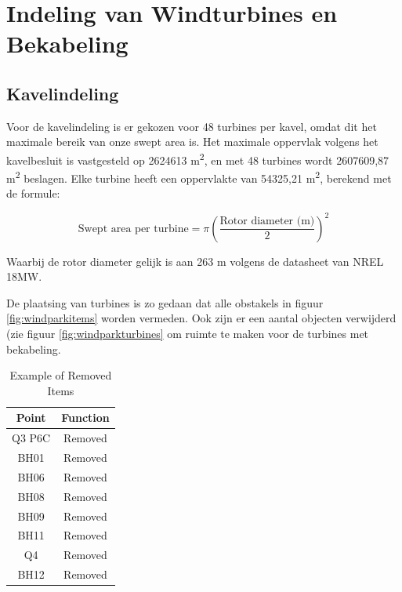 \section{Indeling van Windturbines en Bekabeling}
\subsection{Kavelindeling}
Voor de kavelindeling is er gekozen voor 48 turbines per kavel, omdat dit het maximale bereik van onze swept area is. Het maximale oppervlak volgens het kavelbesluit is vastgesteld op 2624613 m\textsuperscript{2}, en met 48 turbines wordt 2607609,87 m\textsuperscript{2} beslagen. Elke turbine heeft een oppervlakte van 54325,21 m\textsuperscript{2}, berekend met de formule:

\begin{equation} \label{eq:25}
\text{{Swept area per turbine}} = \pi \left(\frac{{\text{{Rotor diameter (m)}}}}{2}\right)^2
\end{equation}

Waarbij de rotor diameter gelijk is aan 263 m volgens de datasheet van NREL 18MW.\cite{NREL_turbine_documentatie}

De plaatsing van turbines is zo gedaan dat alle obstakels in figuur \ref{fig:windparkitems} worden vermeden. Ook zijn er een aantal objecten verwijderd (zie figuur \ref{fig:windparkturbines} om ruimte te maken voor de turbines met bekabeling.
\begin{table}[h]
    \centering
    \begin{tabular}{|c|c|}
        \hline
        \textbf{Point} & \textbf{Function} \\
        \hline
        Q3 P6C & Removed \\
        \hline
        BH01 & Removed \\
        \hline
        BH06 & Removed \\
        \hline
        BH08 & Removed \\
        \hline
        BH09 & Removed \\
        \hline
        BH11 & Removed \\
        \hline
        Q4 & Removed \\
        \hline
        BH12 & Removed \\
        \hline
    \end{tabular}
    \caption{Example of Removed Items}
    \label{tab:removed-items}
\end{table}

